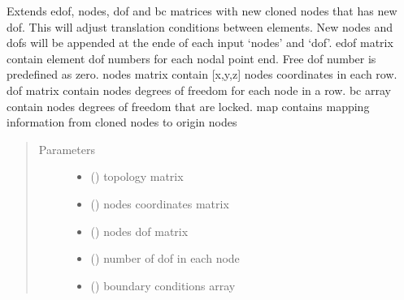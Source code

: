 \documentclass[letterpaper,10pt,english]{sphinxmanual}
\begin{document}

\begin{fulllineitems}
\label{\detokenize{api:beamon.core.make_joints}}
Extends edof, nodes, dof and bc matrices with new cloned nodes that has new dof.
This will adjust translation conditions between elements.
New nodes and dofs will be appended at the ende of each input ‘nodes’ and ‘dof’.
edof matrix contain element dof numbers for each nodal point end. Free dof number is predefined as zero.
nodes matrix contain {[}x,y,z{]} nodes coordinates in each row.
dof matrix contain nodes degrees of freedom for each node in a row.
bc array contain nodes degrees of freedom that are locked.
map contains mapping information from cloned nodes to origin nodes
\begin{quote}\begin{description}
\item[{Parameters}] \leavevmode\begin{itemize}
\item {} 
 () \textendash{} topology matrix

\item {} 
 () \textendash{} nodes coordinates matrix

\item {} 
 () \textendash{} nodes dof matrix

\item {} 
 (\sphinxstyleliteralemphasis{\sphinxupquote{ (}}\sphinxstyleliteralemphasis{\sphinxupquote{)}}) \textendash{} number of dof in each node

\item {} 
 () \textendash{} boundary conditions array


\end{itemize}
\end{description}
\end{quote}
\end{fulllineitems}
\end{document}
